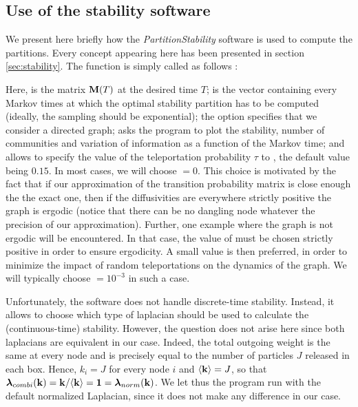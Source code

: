 \subsection{Use of the stability software}
We present here briefly how the \textit{PartitionStability} software is used to compute the partitions. Every concept appearing here has been presented in section \ref{sec:stability}. The  function is simply called as follows : \vspace{-.2cm}
\begin{center}
\end{center} %
Here,  is the matrix $\mathbf M(T)$ at the desired time $T$;  is the vector containing every Markov times at which the optimal stability partition has to be computed (ideally, the sampling should be exponential); the  option specifies that we consider a directed graph;  asks the program to plot the stability, number of communities and variation of information as a function of the Markov time; and  allows to specify the value of the teleportation probability $\tau$ to , the default value being $0.15$. In most cases, we will choose  $= 0$. This choice is motivated by the fact that if our approximation of the transition probability matrix is close enough the the exact one, then if the diffusivities are everywhere strictly positive the graph is ergodic (notice that there can be no dangling node whatever the precision of our approximation). Further, one example where the graph is not ergodic will be encountered. In that case, the value of  must be chosen strictly positive in order to ensure ergodicity. A small value is then preferred, in order to minimize the impact of random teleportations on the dynamics of the graph. We will typically choose  $=10^{-3}$ in such a case.

Unfortunately, the software does not handle discrete-time stability. Instead, it allows to choose which type of laplacian should be used to calculate the (continuous-time) stability. However, the question does not arise here since both laplacians are equivalent in our case. Indeed, the total outgoing weight is the same at every node and is precisely equal to the number of particles $J$ released in each box. Hence, $k_i = J$ for every node $i$ and $\langle \mathbf k \rangle = J$, so that $\boldsymbol \lambda_{combi}(\mathbf k) = \mathbf k/ \langle \mathbf k \rangle = \mathbf 1 = \boldsymbol \lambda_{norm}(\mathbf k)$. We let thus the program run with the default normalized Laplacian, since it does not make any difference in our case.

